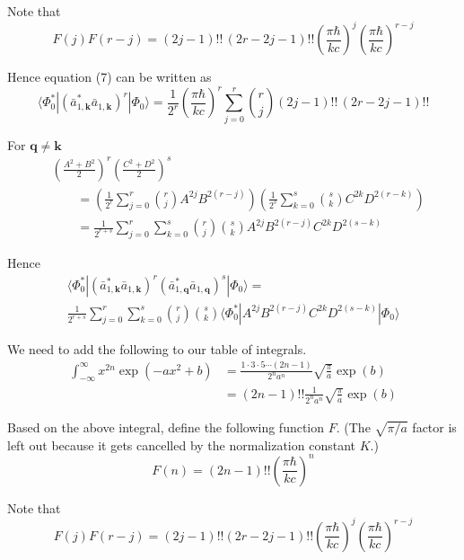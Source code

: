 \documentclass[12pt]{article}
\begin{document}
Note that
\begin{equation*}
F(j)F(r-j)=
(2j-1)!!\,(2r-2j-1)!!
\left(\frac{\pi\hbar}{kc}\right)^j
\left(\frac{\pi\hbar}{kc}\right)^{r-j}
\end{equation*}

Hence equation (7) can be written as
\begin{equation*}
\langle\Phi_0^*|(\bar a_{1,\mathbf k}^*\bar a_{1,\mathbf k})^r|\Phi_0\rangle
=\frac{1}{2^r}
\left(\frac{\pi\hbar}{kc}\right)^r
\sum_{j=0}^r\binom{r}{j}
(2j-1)!!\,(2r-2j-1)!!
\end{equation*}

For $\mathbf q\ne\mathbf k$
\begin{equation*}
\begin{aligned}
&\left(\frac{A^2+B^2}{2}\right)^r\left(\frac{C^2+D^2}{2}\right)^s
\\
&\qquad{}=\left(\frac{1}{2^r}\sum_{j=0}^r\binom{r}{j}A^{2j}B^{2(r-j)}\right)
\left(\frac{1}{2^s}\sum_{k=0}^s\binom{s}{k}C^{2k}D^{2(r-k)}\right)
\\
&\qquad{}=\frac{1}{2^{r+s}}\sum_{j=0}^r\sum_{k=0}^s
\binom{r}{j}\binom{s}{k}
A^{2j}B^{2(r-j)}C^{2k}D^{2(s-k)}
\end{aligned}
\end{equation*}

Hence
\begin{multline*}
\langle\Phi_0^*|
(\bar a_{1,\mathbf k}^*\bar a_{1,\mathbf k})^r
(\bar a_{1,\mathbf q}^*\bar a_{1,\mathbf q})^s
|\Phi_0\rangle={}
\\
\frac{1}{2^{r+s}}\sum_{j=0}^r\sum_{k=0}^s
\binom{r}{j}\binom{s}{k}
\langle\Phi_0^*|
A^{2j}B^{2(r-j)}C^{2k}D^{2(s-k)}
|\Phi_0\rangle
\end{multline*}

We need to add the following to our table of integrals.
\begin{align*}
\int_{-\infty}^\infty x^{2n}\exp(-ax^2+b)
&=\frac{1\cdot3\cdot5\cdots(2n-1)}{2^na^n}\sqrt{\frac{\pi}{a}}\exp(b)
\\
&=(2n-1)!!\frac{1}{2^na^n}\sqrt{\frac{\pi}{a}}\exp(b)
\end{align*}

Based on the above integral, define the following function $F$.
(The $\sqrt{\pi/a}$ factor is left out because it gets cancelled by the normalization constant $K$.)
\begin{equation*}
F(n)=(2n-1)!!\left(\frac{\pi\hbar}{kc}\right)^n
\end{equation*}

Note that
\begin{equation*}
F(j)F(r-j)=
(2j-1)!!(2r-2j-1)!!
\left(\frac{\pi\hbar}{kc}\right)^j
\left(\frac{\pi\hbar}{kc}\right)^{r-j}
\end{equation*}
\end{document}
